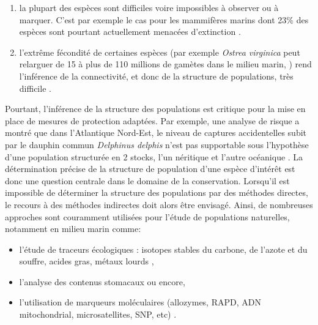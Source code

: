 \documentclass[a4paper,12pt,twoside]{article}\usepackage[]{graphicx}\usepackage[]{color}
\begin{document}
\begin{enumerate}
	\item la plupart des espèces sont difficiles voire impossibles à observer ou à marquer. C'est par exemple le cas pour les mammifères marins dont 23\% des espèces sont pourtant actuellement menacées d'extinction \citep{schipper2008status}.
	\item l'extrême fécondité de certaines espèces (par exemple \emph{Ostrea virginica} peut relarguer de 15 à plus de 110 millions de gamètes dans le milieu marin, \citealp{galtsoff1930fecundity}) rend l'inférence de la connectivité, et donc de la structure de populations, très difficile \citep{gagnaire2015aa}.
\end{enumerate}

Pourtant, l'inférence de la structure des populations est critique pour la mise en place de mesures de protection adaptées. Par exemple, une analyse de risque a montré que dans l'Atlantique Nord-Est, le niveau de captures accidentelles subit par le dauphin commun \emph{Delphinus delphis} n'est pas supportable sous l'hypothèse d'une population structurée en 2 stocks, l'un néritique et l'autre océanique \citep{Mannocci2012}. La détermination précise de la structure de population d'une espèce d'intérêt est donc une question centrale dans le domaine de la conservation. Lorsqu'il est impossible de déterminer la structure des populations par des méthodes directes, le recours à des méthodes indirectes doit alors être envisagé. Ainsi, de nombreuses approches sont couramment utilisées pour l'étude de populations naturelles, notamment en milieu marin comme: 
\begin{itemize}
	\item l'étude de traceurs écologiques : isotopes stables du carbone, de l'azote et du souffre, acides gras, métaux lourds \citep{newman2000stock},
	\item l'analyse des contenus stomacaux \citep{spitz2006diet, spitz2011prey} ou encore,
	\item l'utilisation de marqueurs moléculaires (allozymes, RAPD, ADN mitochondrial, microsatellites, SNP, etc) \citep{pogson1995genetic, huang2000analysis}.
\end{itemize}
\end{document}
